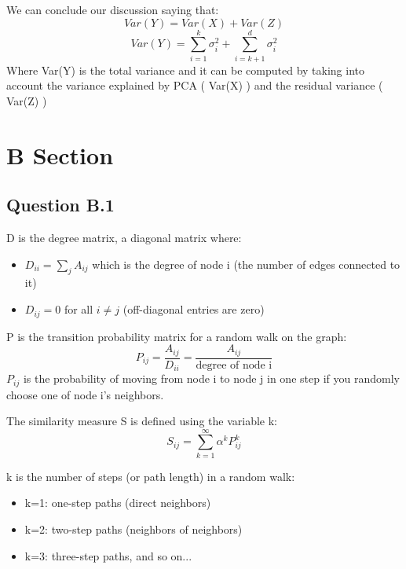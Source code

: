 \documentclass[a4paper]{scrartcl}
\begin{document}
We can conclude our discussion saying that:
\[
Var(Y) = Var(X) + Var(Z)
\]
\[
Var(Y) = \sum_{i=1}^{k}\sigma_i^2 + \sum_{i=k+1}^{d}\sigma_i^2
\]
Where Var(Y) is the total variance and it can be computed by taking into account the variance explained by PCA ( Var(X) ) and the residual variance ( Var(Z) )

\section*{B Section}

\subsection*{Question B.1}
D is the degree matrix, a diagonal matrix where:
\begin{itemize}
\item $D_{ii} = \sum_{j} A_{ij}$ which is the degree of node i (the number of edges connected to it)
\item $D_{ij} = 0$ for all $i \neq j$ (off-diagonal entries are zero)
\end{itemize}

P is the transition probability matrix for a random walk on the graph:
\[
P_{ij} = \frac{A_{ij}}{D_{ii}} = \frac{A_{ij}}{\text{degree of node i}}
\]
$P_{ij}$ is the probability of moving from node i to node j in one step if you randomly choose one of node i's neighbors.

The similarity measure S is defined using the variable k:
\[
S_{ij} = \sum_{k=1}^{\infty} \alpha^k P_{ij}^k
\]

k is the number of steps (or path length) in a random walk:
\begin{itemize}
\item k=1: one-step paths (direct neighbors)
\item k=2: two-step paths (neighbors of neighbors)
\item k=3: three-step paths, and so on...
\end{itemize}
\end{document}
